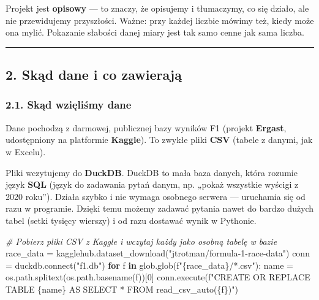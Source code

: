 \documentclass[
]{article}
\newenvironment{Shaded}{}{}
\newcommand{\CommentTok}[1]{\textcolor[rgb]{0.38,0.63,0.69}{\textit{#1}}}
\newcommand{\ControlFlowTok}[1]{\textcolor[rgb]{0.00,0.44,0.13}{\textbf{#1}}}
\newcommand{\DecValTok}[1]{\textcolor[rgb]{0.25,0.63,0.44}{#1}}
\newcommand{\ExtensionTok}[1]{#1}
\newcommand{\KeywordTok}[1]{\textcolor[rgb]{0.00,0.44,0.13}{\textbf{#1}}}
\newcommand{\NormalTok}[1]{#1}
\newcommand{\OperatorTok}[1]{\textcolor[rgb]{0.40,0.40,0.40}{#1}}
\newcommand{\SpecialCharTok}[1]{\textcolor[rgb]{0.25,0.44,0.63}{#1}}
\newcommand{\SpecialStringTok}[1]{\textcolor[rgb]{0.73,0.40,0.53}{#1}}
\newcommand{\StringTok}[1]{\textcolor[rgb]{0.25,0.44,0.63}{#1}}
\begin{document}
Projekt jest \textbf{opisowy} --- to znaczy, że opisujemy i tłumaczymy, co się działo, ale nie przewidujemy
przyszłości. Ważne: przy każdej liczbie mówimy też, kiedy może ona mylić. Pokazanie słabości danej
miary jest tak samo cenne jak sama liczba.

\begin{center}\rule{0.5\linewidth}{0.5pt}
\end{center}

\subsection{2. Skąd dane i co zawierają}\label{skux105d-dane-i-co-zawierajux105}

\subsubsection{2.1. Skąd wzięliśmy dane}\label{skux105d-wziux119liux15bmy-dane}

Dane pochodzą z darmowej, publicznej bazy wyników F1 (projekt \textbf{Ergast}, udostępniony na platformie
\textbf{Kaggle}). To zwykłe pliki \textbf{CSV} (tabele z danymi, jak w Excelu).

Pliki wczytujemy do \textbf{DuckDB}. DuckDB to mała baza danych, która rozumie język \textbf{SQL} (język do
zadawania pytań danym, np. „pokaż wszystkie wyścigi z 2020 roku''). Działa szybko i nie wymaga osobnego
serwera --- uruchamia się od razu w programie. Dzięki temu możemy zadawać pytania nawet do bardzo dużych
tabel (setki tysięcy wierszy) i od razu dostawać wynik w Pythonie.

\begin{Shaded}
  \begin{Highlighting}[]
    \CommentTok{\# Pobierz pliki CSV z Kaggle i wczytaj każdy jako osobną tabelę w bazie}
    \NormalTok{race\_data }\OperatorTok{=}\NormalTok{ kagglehub.dataset\_download(}\StringTok{"jtrotman/formula{-}1{-}race{-}data"}\NormalTok{)}
    \NormalTok{conn }\OperatorTok{=}\NormalTok{ duckdb.}\ExtensionTok{connect}\NormalTok{(}\StringTok{"f1.db"}\NormalTok{)}
    \ControlFlowTok{for}\NormalTok{ f }\KeywordTok{in}\NormalTok{ glob.glob(}\SpecialStringTok{f"}\SpecialCharTok{\{}\NormalTok{race\_data}\SpecialCharTok{\}}\SpecialStringTok{/*.csv"}\NormalTok{):}
    \NormalTok{    name }\OperatorTok{=}\NormalTok{ os.path.splitext(os.path.basename(f))[}\DecValTok{0}\NormalTok{]}
    \NormalTok{    conn.execute(}\SpecialStringTok{f"CREATE OR REPLACE TABLE }\SpecialCharTok{\{}\NormalTok{name}\SpecialCharTok{\}}\SpecialStringTok{ AS SELECT * FROM read\_csv\_auto(\textquotesingle{}}\SpecialCharTok{\{}\NormalTok{f}\SpecialCharTok{\}}\SpecialStringTok{\textquotesingle{})"}\NormalTok{)}
  \end{Highlighting}
\end{Shaded}
\end{document}
